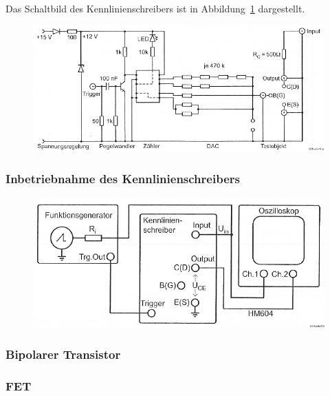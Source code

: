 \fehlt

Das Schaltbild des Kennlinienschreibers ist in Abbildung~\ref{fig:3-1} dargestellt.

\begin{figure}[htbp]
	\centering
	\includegraphics[width=\textwidth]{Anleitung/3-1.png}
	\caption{
		\cite[Abbildung~3.1]{physik313-Anleitung}
	}
	\label{fig:3-1}
\end{figure}

\fehlt

\subsubsection{Inbetriebnahme des Kennlinienschreibers}

\begin{figure}[htbp]
	\centering
	\includegraphics[width=\textwidth]{Anleitung/3-2.png}
	\caption{
		\cite[Abbildung~3.2]{physik313-Anleitung}
	}
	\label{fig:3-2}
\end{figure}

\fehlt

\subsubsection{Bipolarer Transistor}

\fehlt

\subsubsection{FET}

